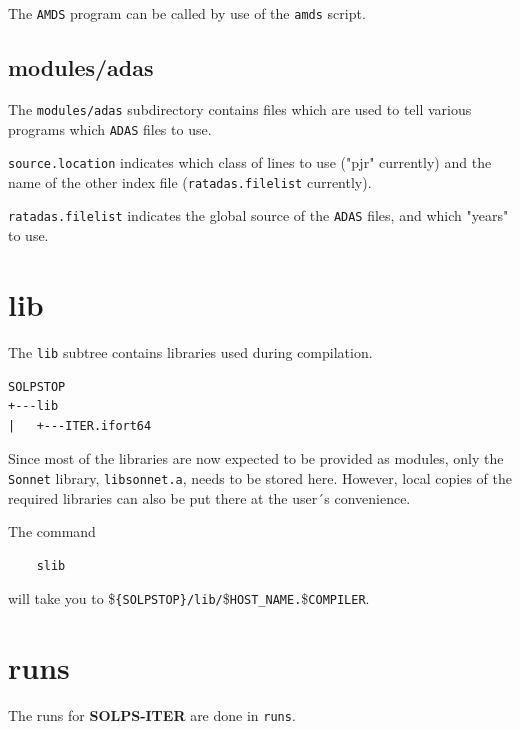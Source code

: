 \documentclass[a4paper,10pt]{report}
\newcommand\SOLPSITER{{\bf SOLPS-ITER} }
\begin{document}
The {\tt AMDS} program can be called by use of the {\tt amds} script.

\subsection{modules/adas}

The {\tt modules/adas} subdirectory contains files which are used to tell various programs
which {\tt ADAS} files to use.

{\tt source.location} indicates which class of lines to use ("pjr"
currently) and the name of the other index file ({\tt ratadas.filelist}
currently).

{\tt ratadas.filelist} indicates the global source of the {\tt ADAS} files,
and which "years" to use.

\newpage \section{lib}


The {\tt lib} subtree contains libraries used during compilation.

\begin{verbatim}
SOLPSTOP
+---lib
|   +---ITER.ifort64
\end{verbatim}

Since most of the libraries are now expected to be provided as modules, only the
{\tt Sonnet} library, {\tt libsonnet.a}, needs to be stored here. However, local
copies of the required libraries can also be put there at the user´s convenience.

The command
\begin{verbatim}
    slib
\end{verbatim}
will take you to \${\tt \{SOLPSTOP\}/lib/}\${\tt {HOST\_NAME}.}\${\tt {COMPILER}}.

\section{runs}
\label{sec:b2runs}

The runs for \SOLPSITER are done in {\tt runs}.

\end{document}
